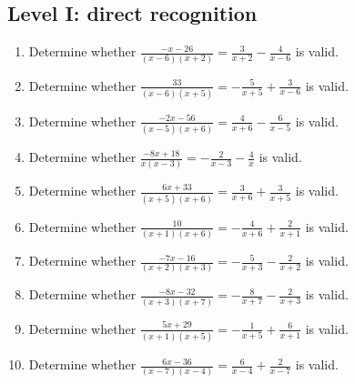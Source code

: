 \documentclass[11pt,oneside]{book}
\begin{document}
\subsection*{Level I: direct recognition}
\begin{enumerate}[leftmargin=*,label=\textbf{\arabic*.},itemsep=0.65\baselineskip]
\item Determine whether $\displaystyle \frac{- x - 26}{\left(x - 6\right) \left(x + 2\right)}=\frac{3}{x + 2} - \frac{4}{x - 6}$ is valid.
\item Determine whether $\displaystyle \frac{33}{\left(x - 6\right) \left(x + 5\right)}=- \frac{5}{x + 5} + \frac{3}{x - 6}$ is valid.
\item Determine whether $\displaystyle \frac{- 2 x - 56}{\left(x - 5\right) \left(x + 6\right)}=\frac{4}{x + 6} - \frac{6}{x - 5}$ is valid.
\item Determine whether $\displaystyle \frac{- 8 x + 18}{x \left(x - 3\right)}=- \frac{2}{x - 3} - \frac{4}{x}$ is valid.
\item Determine whether $\displaystyle \frac{6 x + 33}{\left(x + 5\right) \left(x + 6\right)}=\frac{3}{x + 6} + \frac{3}{x + 5}$ is valid.
\item Determine whether $\displaystyle \frac{10}{\left(x + 1\right) \left(x + 6\right)}=- \frac{4}{x + 6} + \frac{2}{x + 1}$ is valid.
\item Determine whether $\displaystyle \frac{- 7 x - 16}{\left(x + 2\right) \left(x + 3\right)}=- \frac{5}{x + 3} - \frac{2}{x + 2}$ is valid.
\item Determine whether $\displaystyle \frac{- 8 x - 32}{\left(x + 3\right) \left(x + 7\right)}=- \frac{8}{x + 7} - \frac{2}{x + 3}$ is valid.
\item Determine whether $\displaystyle \frac{5 x + 29}{\left(x + 1\right) \left(x + 5\right)}=- \frac{1}{x + 5} + \frac{6}{x + 1}$ is valid.
\item Determine whether $\displaystyle \frac{6 x - 36}{\left(x - 7\right) \left(x - 4\right)}=\frac{6}{x - 4} + \frac{2}{x - 7}$ is valid.
\end{enumerate}
\end{document}
